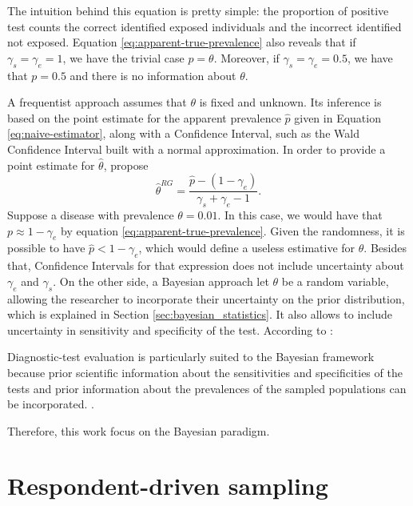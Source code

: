 The intuition behind this equation is pretty simple: the proportion
of positive test counts the correct identified exposed individuals and the
incorrect identified not exposed. Equation \eqref{eq:apparent-true-prevalence}
also reveals that if $\gamma_s = \gamma_e = 1$, we have the trivial 
case $p = \theta$. Moreover, if $\gamma_s = \gamma_e = 0.5$, we have that
$p = 0.5$ and there is no information about $\theta$. 

A frequentist approach assumes that $\theta$ is fixed and unknown. Its
inference is based on the point 
estimate for the apparent prevalence $\hat{p}$ given in Equation
\eqref{eq:naive-estimator}, along with a Confidence Interval, such as the Wald
Confidence Interval built with a normal approximation. In order to provide a 
point estimate for $\hat{\theta}$, \textcite[p. 73]{rogan1978estimating} propose
$$\hat{\theta}^{RG} = \frac{\hat{p} - (1-\gamma_e)}{\gamma_s + \gamma_e -
1}.$$ 
Suppose a disease with prevalence $\theta = 0.01$. In this case, we would have
that $p \approx 1 - \gamma_e$ by equation \eqref{eq:apparent-true-prevalence}.
Given the randomness, it is possible to have $\hat{p} < 1 - \gamma_e$, which
would define a useless estimative for $\theta$. Besides that, Confidence Intervals for that 
expression does not include uncertainty about $\gamma_e$ and $\gamma_s$. On
the other side, a Bayesian approach let $\theta$ be a random variable,
allowing the researcher to incorporate their uncertainty on the prior
distribution, which is explained in Section
\ref{sec:bayesian_statistics}. It also allows to include uncertainty in
sensitivity and specificity of the test. According to \textcite{branscum2005estimation}:
\begin{citacao}
  Diagnostic-test evaluation is particularly suited to the
  Bayesian framework because prior scientific information about the
  sensitivities and specificities of the tests and prior information about the prevalences of the sampled
  populations can be incorporated. \cite[p. 1]{branscum2005estimation}.
\end{citacao}

Therefore, this work focus on the Bayesian paradigm.

\section{Respondent-driven sampling}
\label{sec:respodent_driven_sampling}

